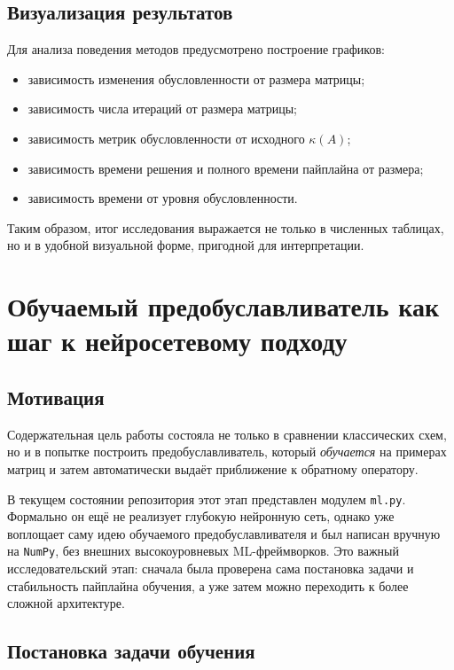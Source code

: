 \documentclass[12pt,a4paper]{article}
\begin{document}
\subsection{Визуализация результатов}

Для анализа поведения методов предусмотрено построение графиков:
\begin{itemize}[leftmargin=*]
    \item зависимость изменения обусловленности от размера матрицы;
    \item зависимость числа итераций от размера матрицы;
    \item зависимость метрик обусловленности от исходного $\kappa(A)$;
    \item зависимость времени решения и полного времени пайплайна от размера;
    \item зависимость времени от уровня обусловленности.
\end{itemize}

Таким образом, итог исследования выражается не только в численных таблицах, но и в удобной визуальной форме, пригодной для интерпретации.

\section{Обучаемый предобуславливатель как шаг к нейросетевому подходу}

\subsection{Мотивация}

Содержательная цель работы состояла не только в сравнении классических схем, но и в попытке построить предобуславливатель, который \emph{обучается} на примерах матриц и затем автоматически выдаёт приближение к обратному оператору.

В текущем состоянии репозитория этот этап представлен модулем \texttt{ml.py}. Формально он ещё не реализует глубокую нейронную сеть, однако уже воплощает саму идею обучаемого предобуславливателя и был написан вручную на \texttt{NumPy}, без внешних высокоуровневых ML-фреймворков. Это важный исследовательский этап: сначала была проверена сама постановка задачи и стабильность пайплайна обучения, а уже затем можно переходить к более сложной архитектуре.

\subsection{Постановка задачи обучения}
\end{document}

